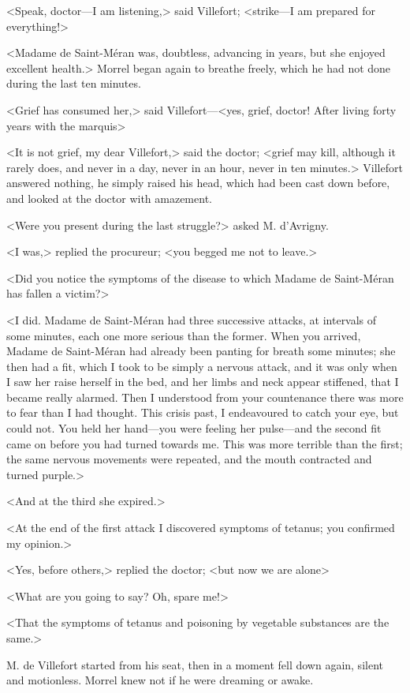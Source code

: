  <Speak, doctor—I am listening,> said Villefort; <strike—I am prepared for everything!> 

 <Madame de Saint-Méran was, doubtless, advancing in years, but she enjoyed excellent health.> Morrel began again to breathe freely, which he had not done during the last ten minutes. 

 <Grief has consumed her,> said Villefort—<yes, grief, doctor! After living forty years with the marquis\longdash> 

 <It is not grief, my dear Villefort,> said the doctor; <grief may kill, although it rarely does, and never in a day, never in an hour, never in ten minutes.> Villefort answered nothing, he simply raised his head, which had been cast down before, and looked at the doctor with amazement. 

 <Were you present during the last struggle?> asked M. d'Avrigny. 

 <I was,> replied the procureur; <you begged me not to leave.> 

 <Did you notice the symptoms of the disease to which Madame de Saint-Méran has fallen a victim?> 

 <I did. Madame de Saint-Méran had three successive attacks, at intervals of some minutes, each one more serious than the former. When you arrived, Madame de Saint-Méran had already been panting for breath some minutes; she then had a fit, which I took to be simply a nervous attack, and it was only when I saw her raise herself in the bed, and her limbs and neck appear stiffened, that I became really alarmed. Then I understood from your countenance there was more to fear than I had thought. This crisis past, I endeavoured to catch your eye, but could not. You held her hand—you were feeling her pulse—and the second fit came on before you had turned towards me. This was more terrible than the first; the same nervous movements were repeated, and the mouth contracted and turned purple.> 

 <And at the third she expired.> 

 <At the end of the first attack I discovered symptoms of tetanus; you confirmed my opinion.> 

 <Yes, before others,> replied the doctor; <but now we are alone\longdash> 

 <What are you going to say? Oh, spare me!> 

 <That the symptoms of tetanus and poisoning by vegetable substances are the same.> 

 M. de Villefort started from his seat, then in a moment fell down again, silent and motionless. Morrel knew not if he were dreaming or awake. 

